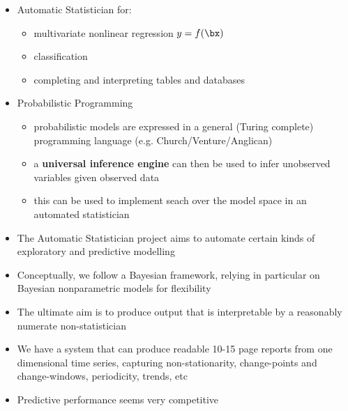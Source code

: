 \begin{itemize}
\item Automatic Statistician for:
\begin{itemize}
\item multivariate nonlinear regression $y = f(\bx)$
\item classification
\item completing and interpreting tables and databases
\end{itemize}
\item Probabilistic Programming
\begin{itemize}
\item probabilistic models are expressed in a general (Turing complete)
  programming language (e.g. Church/Venture/Anglican)
\item a {\bf universal inference engine} can then be used to infer
  unobserved variables given observed data
\item this can be used to implement seach over the model space in an
  automated statistician
\end{itemize}

\end{itemize}




\vspace*{-3ex}
\begin{itemize}
\item The Automatic Statistician project aims to automate certain
  kinds of exploratory and predictive modelling
\item Conceptually, we follow a Bayesian framework, relying in
  particular on Bayesian nonparametric models for flexibility 
\item The ultimate aim is to produce output that is interpretable by a
  reasonably numerate non-statistician
\item We have a system that can produce readable 10-15 page reports from one
  dimensional time series, capturing non-stationarity, change-points
  and change-windows, periodicity, trends, etc 
\item Predictive performance seems very competitive 
\end{itemize}



